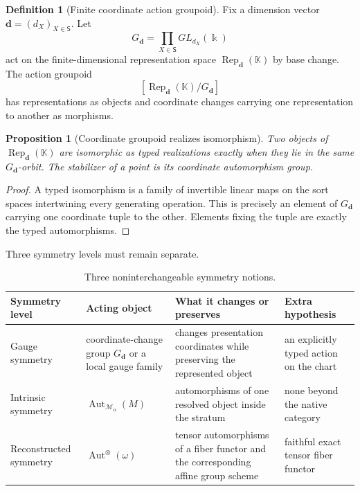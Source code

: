 \documentclass[11pt]{article}
\newtheorem{proposition}[theorem]{Proposition}
\theoremstyle{definition}
\newtheorem{definition}[theorem]{Definition}
\theoremstyle{remark}
\DeclareMathOperator{\Rep}{Rep}
\DeclareMathOperator{\Aut}{Aut}
\newcommand{\bbK}{\mathbb K}
\newcommand{\kk}{\Bbbk}
\begin{document}
\begin{definition}[Finite coordinate action groupoid]
\label{def:coordinate-action-groupoid}
Fix a dimension vector \(\mathbf d=(d_X)_{X\in\mathsf S}\).  Let
\[
G_{\mathbf d}=\prod_{X\in\mathsf S}GL_{d_X}(\kk)
\]
act on the finite-dimensional representation space \(\Rep_{\mathbf d}(\bbK)\) by base change.  The action groupoid
\[
[\Rep_{\mathbf d}(\bbK)/G_{\mathbf d}]
\]
has representations as objects and coordinate changes carrying one representation to another as morphisms.
\end{definition}

\begin{proposition}[Coordinate groupoid realizes isomorphism]
\label{prop:coordinate-groupoid-isomorphism}
Two objects of \(\Rep_{\mathbf d}(\bbK)\) are isomorphic as typed realizations exactly when they lie in the same \(G_{\mathbf d}\)-orbit.  The stabilizer of a point is its coordinate automorphism group.
\end{proposition}

\begin{proof}
A typed isomorphism is a family of invertible linear maps on the sort spaces intertwining every generating operation.  This is precisely an element of \(G_{\mathbf d}\) carrying one coordinate tuple to the other.  Elements fixing the tuple are exactly the typed automorphisms.
\end{proof}

Three symmetry levels must remain separate.

\begin{table}[htbp]
\centering
\caption{Three noninterchangeable symmetry notions.}
\label{tab:symmetry-levels}
\small
\begin{tabularx}{\textwidth}{@{}L{0.18\textwidth}L{0.26\textwidth}Y L{0.22\textwidth}@{}}
\toprule
Symmetry level & Acting object & What it changes or preserves & Extra hypothesis\\
\midrule
Gauge symmetry & coordinate-change group \(G_{\mathbf d}\) or a local gauge family & changes presentation coordinates while preserving the represented object & an explicitly typed action on the chart\\
Intrinsic symmetry & \(\Aut_{\mathcal M_\alpha}(M)\) & automorphisms of one resolved object inside the stratum & none beyond the native category\\
Reconstructed symmetry & \(\Aut^{\otimes}(\omega)\) & tensor automorphisms of a fiber functor and the corresponding affine group scheme & faithful exact tensor fiber functor\\
\bottomrule
\end{tabularx}
\end{table}
\end{document}
